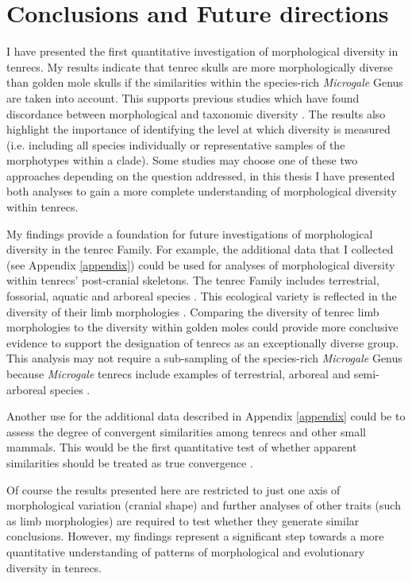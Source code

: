 \section{Conclusions and Future directions}
\label{sect:concl}

	I have presented the first quantitative investigation of morphological diversity in tenrecs. My results indicate that tenrec skulls are more morphologically diverse than golden mole skulls if the similarities within the species-rich \textit{Microgale} Genus are taken into account. This supports previous studies which have found discordance between morphological and taxonomic diversity \citep[e.g.][]{Ruta2013, Hopkins2013}. The results also highlight the importance of identifying the level at which diversity is measured (i.e. including all species individually or representative samples of the morphotypes within a clade). Some studies may choose one of these two approaches depending on the question addressed, in this thesis I have presented both analyses to gain a more complete understanding of morphological diversity within tenrecs. 
	
	My findings provide a foundation for future investigations of morphological diversity in the tenrec Family. For example, the additional data that I collected (see Appendix \ref{appendix}) could be used for analyses of morphological diversity within tenrecs' post-cranial skeletons. The tenrec Family includes terrestrial, fossorial, aquatic and arboreal species \citep{Olson2013, Soarimalala2011}. This ecological variety is reflected in the diversity of their limb morphologies \citep{Salton2009, Salton2004}. Comparing the diversity of tenrec limb morphologies to the diversity within golden moles could provide more conclusive evidence to support the designation of tenrecs as an exceptionally diverse group. This analysis may not require a sub-sampling of the species-rich \textit{Microgale} Genus because \textit{Microgale} tenrecs include examples of terrestrial, arboreal and semi-arboreal species \citep{Soarimalala2011}.	
	
	Another use for the additional data described in Appendix \ref{appendix} could be to assess the degree of convergent similarities among tenrecs and other small mammals. This would be the first quantitative test of whether apparent similarities \citep{Olson2013, Soarimalala2011, Eisenberg1969} should be treated as true convergence \citep[e.g.][]{Losos2011, Stayton2008}.
	
	Of course the results presented here are restricted to just one axis of morphological variation (cranial shape) and further analyses of other traits (such as limb morphologies) are required to test whether they generate similar conclusions. However, my findings represent a significant step towards a more quantitative understanding of patterns of morphological and evolutionary diversity in tenrecs. 

